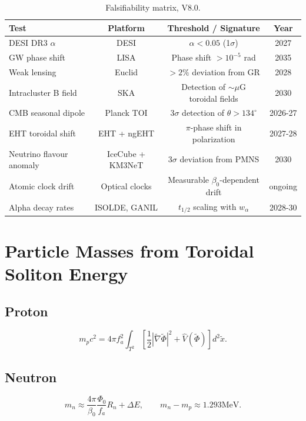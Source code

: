 \documentclass[11pt,a4paper]{article}
\begin{document}
\begin{table}[H]
\centering
\caption{Falsifiability matrix, V8.0.}
\begin{tabular}{lccc}
\toprule
Test & Platform & Threshold / Signature & Year \\
\midrule
DESI DR3 \(\alpha\) & DESI & \(\alpha < 0.05\) (1\(\sigma\)) & 2027 \\
GW phase shift & LISA & Phase shift \(>10^{-5}\) rad & 2035 \\
Weak lensing & Euclid & \(>2\%\) deviation from GR & 2028 \\
Intracluster B field & SKA & Detection of \(\sim\mu\)G toroidal fields & 2030 \\
CMB seasonal dipole & Planck TOI & 3\(\sigma\) detection of \(\theta >134^\circ\) & 2026-27 \\
EHT toroidal shift & EHT + ngEHT & \(\pi\)-phase shift in polarization & 2027-28 \\
Neutrino flavour anomaly & IceCube + KM3NeT & 3\(\sigma\) deviation from PMNS & 2030 \\
Atomic clock drift & Optical clocks & Measurable \(\beta_0\)-dependent drift & ongoing \\
Alpha decay rates & ISOLDE, GANIL & \(t_{1/2}\) scaling with \(w_\alpha\) & 2028-30 \\
\bottomrule
\end{tabular}
\end{table}

\section{Particle Masses from Toroidal Soliton Energy}

\subsection{Proton}
\begin{equation}
m_{p}c^{2} = 4\pi f_{a}^{2}\int_{T^{2}}\left[\frac{1}{2} |\tilde{\nabla}\tilde{\Phi}|^{2} + \hat{V} (\tilde{\Phi})\right]d^{2}\tilde{x}. \tag{68}
\end{equation}

\subsection{Neutron}
\begin{equation}
m_{n}\approx \frac{4\pi}{\beta_{0}}\frac{\Phi_{0}}{f_{a}} R_{n} + \Delta E,\qquad m_{n} - m_{p}\approx 1.293\mathrm{MeV}. \tag{69}
\end{equation}
\end{document}

